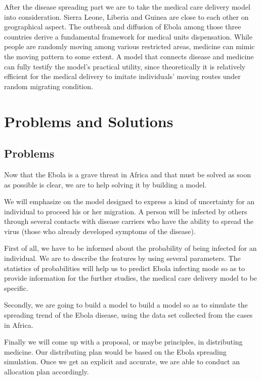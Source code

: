 \documentclass[11pt]{article}
\begin{document}
After the disease spreading part we are to take the medical care delivery model into consideration. Sierra Leone, Liberia and Guinea are close to each other on geographical aspect. The outbreak and diffusion of Ebola among those three countries derive a fundamental framework for medical units dispensation. While people are randomly moving among various restricted areas, medicine can mimic the moving pattern to some extent. A model that connects disease and medicine can fully testify the model's practical utility, since theoretically it is relatively efficient for the medical delivery to imitate individuals' moving routes under random migrating condition. 

\section{Problems and Solutions}

\subsection{Problems}%

Now that the Ebola is a grave threat in Africa and that must be solved as soon as possible is clear, we are to help solving it by building a model.

We will emphasize on the model designed to express a kind of uncertainty for an individual to proceed his or her migration. A person will be infected by others through several contacts with disease carriers who have the ability to spread the virus (those who already developed symptoms of the disease).

First of all, we have to be informed about the probability of being infected for an individual. We are to describe the features by using several parameters. The statistics of probabilities will help us to predict Ebola infecting mode so as to provide information for the further studies, the medical care delivery model to be specific.

Secondly, we are going to build a model to build a model so as to simulate the spreading trend of the Ebola disease, using the data set collected from the cases in Africa.

Finally we will come up with a proposal, or maybe principles, in distributing medicine. Our distributing plan would be based on the Ebola spreading simulation. Once we get an explicit and accurate, we are able to conduct an allocation plan accordingly.
\end{document}

